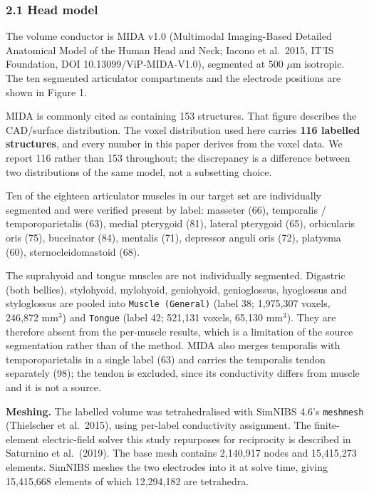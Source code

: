 \documentclass[
  11pt,
]{article}
\begin{document}
\subsubsection{2.1 Head model}\label{head-model}

The volume conductor is MIDA v1.0 (Multimodal Imaging-Based Detailed Anatomical
Model of the Human Head and Neck; Iacono et al.~2015, IT'IS Foundation, DOI
10.13099/ViP-MIDA-V1.0), segmented at 500 \(\mu\)m isotropic. The ten segmented
articulator compartments and the electrode positions are shown in Figure 1.

MIDA is commonly cited as containing 153 structures. That figure describes the
CAD/surface distribution. The voxel distribution used here carries \textbf{116
labelled structures}, and every number in this paper derives from the voxel
data. We report 116 rather than 153 throughout; the discrepancy is a difference
between two distributions of the same model, not a subsetting choice.

Ten of the eighteen articulator muscles in our target set are individually
segmented and were verified present by label: masseter (66), temporalis /
temporoparietalis (63), medial pterygoid (81), lateral pterygoid (65),
orbicularis oris (75), buccinator (84), mentalis (71), depressor anguli oris
(72), platysma (60), sternocleidomastoid (68).

The suprahyoid and tongue muscles are not individually segmented. Digastric
(both bellies), stylohyoid, mylohyoid, geniohyoid, genioglossus, hyoglossus and
styloglossus are pooled into \texttt{Muscle\ (General)} (label 38; 1,975,307 voxels,
246,872 mm\(^{3}\)) and \texttt{Tongue} (label 42; 521,131 voxels, 65,130 mm\(^{3}\)). They are
therefore absent from the per-muscle results, which is a limitation of the
source segmentation rather than of the method. MIDA also merges temporalis with
temporoparietalis in a single label (63) and carries the temporalis tendon
separately (98); the tendon is excluded, since its conductivity differs from
muscle and it is not a source.

\textbf{Meshing.} The labelled volume was tetrahedralised with SimNIBS 4.6's
\texttt{meshmesh} (Thielscher et al.~2015), using per-label conductivity assignment. The
finite-element electric-field solver this study repurposes for reciprocity is
described in Saturnino et al.~(2019). The base mesh contains
2,140,917 nodes and 15,415,273 elements. SimNIBS meshes the two electrodes into
it at solve time, giving 15,415,668 elements of which 12,294,182 are tetrahedra.
\end{document}
